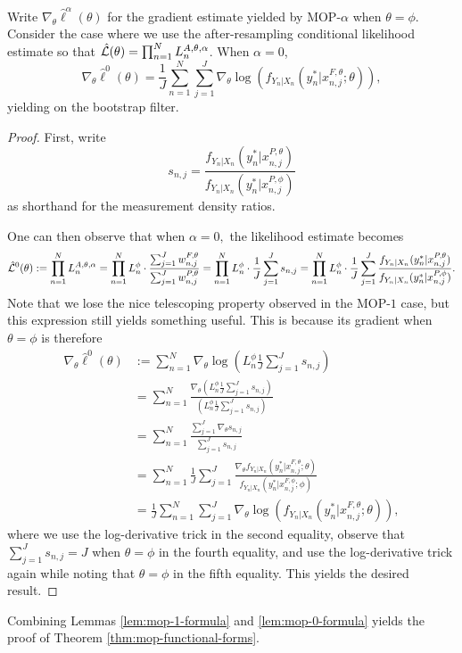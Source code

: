 \begin{lem}
\label{lem:mop-0-formula}

 Write $\nabla_\theta \hat\ell^\alpha(\theta)$ for the gradient estimate yielded by MOP-$\alpha$ when $\theta=\phi$. Consider the case where we use the after-resampling conditional likelihood estimate so that $\hat{\mathcal{L}}(\theta) = \prod_{n=1}^N L_n^{A, \theta, \alpha}$. When $\alpha=0$,
    \begin{equation}
        \nabla_\theta \hat\ell^0(\theta) 
        = \frac{1}{J} \sum_{n=1}^N \sum_{j=1}^J \nabla_\theta \log\left(f_{Y_n|X_{n}}(y_n^*|x_{n,j}^{F, \theta}; \theta)\right),
    \end{equation}
    yielding \cite{naesseth18} on the bootstrap filter. 
\end{lem}

\begin{proof}
First, write $$s_{n,j} = \frac{f_{Y_n|X_n}(y_n^*|x_{n,j}^{P, \theta})}{f_{Y_n|X_n}(y_n^*|x_{n,j}^{P, \phi})}$$
as shorthand for the measurement density ratios. 


One can then observe that when $\alpha=0,$ the likelihood estimate becomes
\begin{equation}
    \hat{\mathcal{L}}^0(\theta) := \prod_{n=1}^N L_n^{A, \theta, \alpha} = \prod_{n=1}^N L_n^\phi \cdot \frac{\sum_{j=1}^J w_{n,j}^{F,\theta}}{\sum_{j=1}^J w_{n,j}^{P,\theta}} = \prod_{n=1}^N L_n^\phi \cdot \frac{1}{J}\sum_{j=1}^J s_{n,j} = \prod_{n=1}^N L_n^\phi \cdot \frac{1}{J}\sum_{j=1}^J \frac{f_{Y_n|X_n}(y_n^*|x_{n,j}^{P, \theta})}{f_{Y_n|X_n}(y_n^*|x_{n,j}^{P, \phi})}.
\end{equation}
Note that we lose the nice telescoping property observed in the MOP-$1$ case, but this expression still yields something useful. This is because its gradient when $\theta=\phi$ is therefore 
\begin{align*}
    \nabla_\theta \hat{\ell}^0(\theta) &:= \sum_{n=1}^N \nabla_\theta \log\left(L_n^\phi \frac{1}{J} \sum_{j=1}^J s_{n,j}\right) \\
    &= \sum_{n=1}^N \frac{\nabla_\theta \left(L_n^\phi \frac{1}{J} \sum_{j=1}^J s_{n,j}\right)}{\left(L_n^\phi \frac{1}{J} \sum_{j=1}^J s_{n,j}\right)} \\
    &= \sum_{n=1}^N \frac{\sum_{j=1}^J \nabla_\theta s_{n,j}}{\sum_{j=1}^J s_{n,j}} \\
    &= \sum_{n=1}^N \frac{1}{J} \sum_{j=1}^J \frac{\nabla_\theta f_{Y_n|X_{n}}(y_n^*|x_{n,j}^{F, \theta}; \theta)}{f_{Y_n|X_{n}}(y_n^*|x_{n,j}^{F, \phi}; \phi)} \\
    &= \frac{1}{J} \sum_{n=1}^N \sum_{j=1}^J \nabla_\theta \log\left(f_{Y_n|X_{n}}(y_n^*|x_{n,j}^{F, \theta}; \theta)\right),
\end{align*}
where we use the log-derivative trick in the second equality, observe that $\sum_{j=1}^J s_{n,j} = J$ when $\theta=\phi$ in the fourth equality, and use the log-derivative trick again while noting that $\theta=\phi$ in the fifth equality. This yields the desired result.
\end{proof}

Combining Lemmas \ref{lem:mop-1-formula} and \ref{lem:mop-0-formula} yields the proof of Theorem \ref{thm:mop-functional-forms}.


